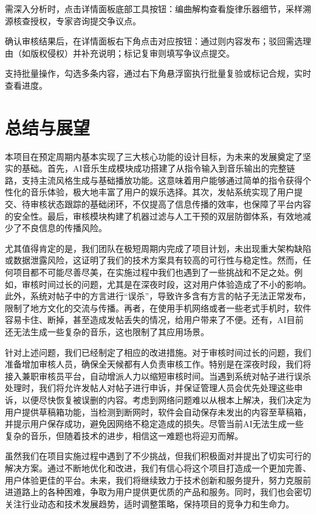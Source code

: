 \documentclass{base}
\numberwithin{figure}{section} %
\begin{document}
需深入分析时，点击详情面板底部工具按钮：编曲解构查看旋律乐器细节，采样溯源核查授权，专家咨询提交争议点。

确认审核结果后，在详情面板右下角点击对应按钮：通过则内容发布；驳回需选理由（如版权侵权）并补充说明；标记复审则填写争议点提交。

支持批量操作，勾选多条内容，通过右下角悬浮窗执行批量复验或标记合规，实时查看进度。

\newpage
\section{总结与展望}

本项目在预定周期内基本实现了三大核心功能的设计目标，为未来的发展奠定了坚实的基础。首先，AI音乐生成模块成功搭建了从指令输入到音乐输出的完整链路，支持主流风格生成与基础播放功能。这意味着用户能够通过简单的指令获得个性化的音乐体验，极大地丰富了用户的娱乐选择。其次，发帖系统实现了用户提交、待审核状态跟踪的基础闭环，不仅提高了信息传播的效率，也保障了平台内容的安全性。最后，审核模块构建了机器过滤与人工干预的双层防御体系，有效地减少了不良信息的传播风险。

尤其值得肯定的是，我们团队在极短周期内完成了项目计划，未出现重大架构缺陷或数据泄露风险，这证明了我们的技术方案具有较高的可行性与稳定性。然而，任何项目都不可能尽善尽美，在实施过程中我们也遇到了一些挑战和不足之处。例如，审核时间过长的问题，尤其是在深夜时段，这对用户体验造成了不小的影响。此外，系统对帖子中的方言进行“误杀”，导致许多含有方言的帖子无法正常发布，限制了地方文化的交流与传播。再者，在使用手机网络或者一些老式手机时，软件容易卡住、断掉，甚至造成发帖丢失的情况，给用户带来了不便。还有，AI目前还无法生成一些复杂的音乐，这也限制了其应用场景。

针对上述问题，我们已经制定了相应的改进措施。对于审核时间过长的问题，我们准备增加审核人员，确保全天候都有人负责审核工作。特别是在深夜时段，我们将接入兼职审核员平台，自动增派人力以缩短审核时间。当遇到系统对帖子进行误杀处理时，我们将允许发帖人对帖子进行申诉，并保证管理人员会优先处理这些申诉，以便尽快恢复被误删的内容。考虑到网络问题难以从根本上解决，我们决定为用户提供草稿箱功能，当检测到断网时，软件会自动保存未发出的内容至草稿箱，并提示用户保存成功，避免因网络不稳定造成的损失。尽管当前AI无法生成一些复杂的音乐，但随着技术的进步，相信这一难题也将迎刃而解。

虽然我们在项目实施过程中遇到了不少挑战，但我们积极面对并提出了切实可行的解决方案。通过不断地优化和改进，我们有信心将这个项目打造成一个更加完善、用户体验更佳的平台。未来，我们将继续致力于技术创新和服务提升，努力克服前进道路上的各种困难，争取为用户提供更优质的产品和服务。同时，我们也会密切关注行业动态和技术发展趋势，适时调整策略，保持项目的竞争力和生命力。
\end{document}
